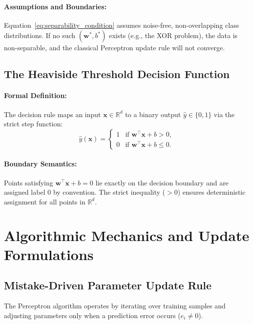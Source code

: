 \documentclass[11pt]{article}
\begin{document}
\paragraph{Assumptions and Boundaries:}
Equation~\eqref{eq:separability_condition} assumes noise-free, non-overlapping class distributions. If no such $(\mathbf{w}^*, b^*)$ exists (e.g., the XOR problem), the data is non-separable, and the classical Perceptron update rule will not converge.

\subsection{The Heaviside Threshold Decision Function}

\paragraph{Formal Definition:}
The decision rule maps an input $\mathbf{x} \in \mathbb{R}^d$ to a binary output $\hat{y} \in \{0, 1\}$ via the strict step function:
\begin{equation}
\label{eq:decision_rule}
\hat{y}(\mathbf{x}) = \begin{cases} 
1 & \text{if } \mathbf{w}^\top \mathbf{x} + b > 0, \\ 
0 & \text{if } \mathbf{w}^\top \mathbf{x} + b \le 0.
\end{cases}
\end{equation}

\paragraph{Boundary Semantics:}
Points satisfying $\mathbf{w}^\top \mathbf{x} + b = 0$ lie exactly on the decision boundary and are assigned label $0$ by convention. The strict inequality ($> 0$) ensures deterministic assignment for all points in $\mathbb{R}^d$.

\section{Algorithmic Mechanics and Update Formulations}
\label{sec:algorithm}

\subsection{Mistake-Driven Parameter Update Rule}
The Perceptron algorithm operates by iterating over training samples and adjusting parameters only when a prediction error occurs ($e_i \ne 0$).
\end{document}
